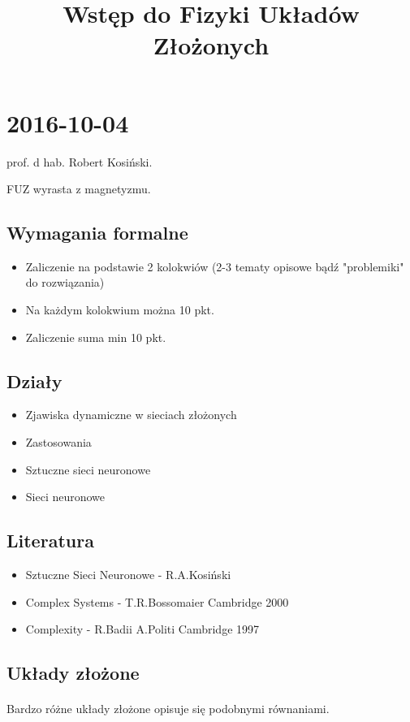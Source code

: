 \documentclass[a4paper,10pt]{article}
\title{Wstęp do Fizyki Układów Złożonych}
\author{}
\begin{document}
\maketitle

\section{2016-10-04}
prof. d hab. Robert Kosiński. 

FUZ wyrasta z magnetyzmu.

\subsection{Wymagania formalne}
\begin{itemize}
 \item Zaliczenie na podstawie 2 kolokwiów (2-3 tematy opisowe bądź "problemiki" do rozwiązania)
 \item Na każdym kolokwium można 10 pkt.
 \item Zaliczenie suma min 10 pkt.
\end{itemize}

\subsection{Działy}
\begin{itemize}
 \item Zjawiska dynamiczne w sieciach złożonych
 \item Zastosowania
 \item Sztuczne sieci neuronowe
 \item Sieci neuronowe
\end{itemize}

\subsection{Literatura}
\begin{itemize}
 \item Sztuczne Sieci Neuronowe - R.A.Kosiński
 \item Complex Systems - T.R.Bossomaier Cambridge 2000
 \item Complexity - R.Badii A.Politi Cambridge 1997
\end{itemize}


\subsection{Układy złożone}
\paragraph{} Bardzo różne układy złożone opisuje się podobnymi równaniami.
\end{document}
